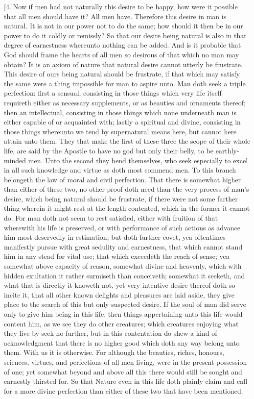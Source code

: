 [4.]Now if men had not naturally this desire to be happy, how were it possible that all men should have it? All men have. Therefore this desire in man is natural. It is not in our power not to do the same; how should it then be in our power to do it coldly or remissly? So that our desire being  natural is also in that degree of earnestness whereunto nothing can be added. And is it probable that God should frame the hearts of all men so desirous of that which no man may obtain? It is an axiom of nature that natural desire cannot utterly be frustrate. This desire of ours being natural should be frustrate, if that which may satisfy the same were a thing impossible for man to aspire unto. Man doth seek a triple perfection: first a sensual, consisting in those things which very life itself requireth either as necessary supplements, or as beauties and ornaments thereof; then an intellectual, consisting in those things which none underneath man is either capable of or acquainted with; lastly a spiritual and divine, consisting in those things whereunto we tend by supernatural means here, but cannot here attain unto them. They that make the first of these three the scope of their whole life, are said by the Apostle to have no god but only their belly, to be earthly-minded men. Unto the second they bend themselves, who seek especially to excel in all such knowledge and virtue as doth most commend men. To this branch belongeth the law of moral and civil perfection. That there is somewhat higher than either of these two, no other proof doth need than the very process of man’s desire, which being natural should be frustrate, if there were not some farther thing wherein it might rest at the length contented, which in the former it cannot do. For man doth not seem to rest satisfied, either with fruition of that wherewith his life is preserved, or with performance of such actions as advance him most deservedly in estimation; but doth further covet, yea oftentimes manifestly pursue with great sedulity and earnestness, that which cannot stand him in any stead for vital use; that which exceedeth the reach of sense; yea somewhat above capacity of reason, somewhat divine and heavenly, which with hidden exultation it rather surmiseth than conceiveth; somewhat it seeketh, and what that is directly it knoweth not, yet very intentive desire thereof doth so incite it, that all other known delights and pleasures are  laid aside, they give place to the search of this but only suspected desire. If the soul of man did serve only to give him being in this life, then things appertaining unto this life would content him, as we see they do other creatures; which creatures enjoying what they live by seek no further, but in this contentation do shew a kind of acknowledgment that there is no higher good which doth any way belong unto them. With us it is otherwise. For although the beauties, riches, honours, sciences, virtues, and perfections of all men living, were in the present possession of one; yet somewhat beyond and above all this there would still be sought and earnestly thirsted for. So that Nature even in this life doth plainly claim and call for a more divine perfection than either of these two that have been mentioned.

